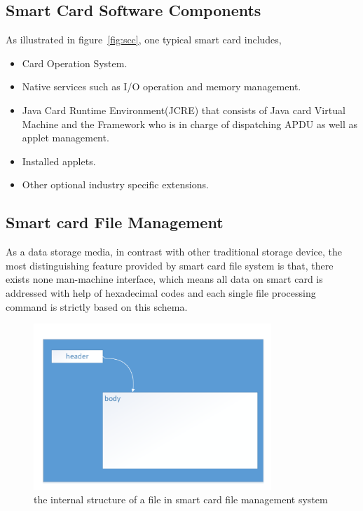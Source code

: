 \subsection{Smart Card Software Components}
As illustrated in figure~\ref{fig:scc}, one typical smart card includes\cite{jcadg},
\begin{itemize}
\item Card Operation System.
\item Native services such as I/O operation and memory management.
\item Java Card Runtime Environment(JCRE) that consists of Java card Virtual Machine and the Framework who is in charge of dispatching APDU as well as applet management.
\item Installed applets. 
\item Other optional industry specific extensions.
\end{itemize}

\subsection{Smart card File Management}
As  a data storage media, in contrast with other traditional storage device, the most distinguishing feature provided by smart card file system is that, there exists none man-machine interface\cite{handbuch}, which means all data on smart card is addressed with help of hexadecimal codes and each single file processing command is strictly based on this schema.

\begin{figure}[!htbp]
	\centering
	\includegraphics[width=0.8\textwidth]{file}
		\caption{the internal structure of a file in smart card file management system\cite{handbuch}}
	\label{fig:file}
\end{figure}

